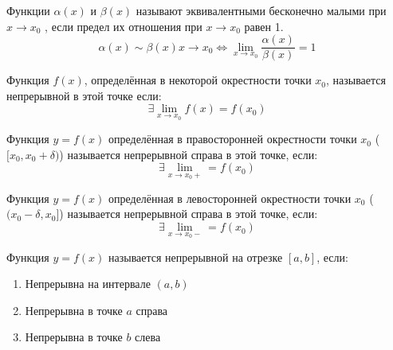 \begin{definition} \label{def:44}
    Функции $\alpha(x)$ и $\beta(x)$ называют эквивалентными бесконечно малыми при $x \to x_0$ , если предел их отношения при $x \to x_0$ равен 1. \[
        \alpha(x) \sim \beta(x) x \to x_0 \iff \lim_{x \to x_0} \frac{\alpha(x)}{\beta(x)} = 1
    \]
\end{definition}

\begin{definition} \label{def:50}
    Функция $f(x)$, определённая в некоторой окрестности точки $x_0$, называется непрерывной в этой точке если: \[
        \exists \lim_{x \to x_0} f(x) = f(x_0)
    \]
\end{definition}

\begin{definition}
    Функция $y = f(x)$ определённая в правосторонней окрестности точки $x_0$ ($[x_0, x_0 + \delta)$) называется непрерывной справа в этой точке, если: \[
        \exists \lim_{x \to x_0+} = f(x_0)
    \] 
\end{definition}

\begin{definition}
    Функция $y = f(x)$ определённая в левосторонней окрестности точки $x_0$ ($(x_0 - \delta, x_0]$) называется непрерывной справа в этой точке, если: \[
        \exists \lim_{x \to x_0-} = f(x_0)
    \] 
\end{definition}

\begin{definition} \label{def:55}
    Функция $y = f(x) $ называется непрерывной на отрезке $[a, b]$, если:
    \begin{enumerate}
        \item Непрерывна на интервале $(a, b)$
        \item Непрерывна в точке $a$ справа
        \item Непрерывна в точке $b$ слева
    \end{enumerate}
\end{definition}
